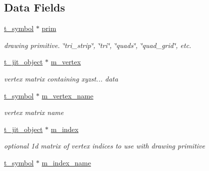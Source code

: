 \subsection*{Data Fields}
\begin{DoxyCompactItemize}
\item 
\hypertarget{structt__jit__glchunk_a22da2556786126c83063dd02d840b942}{
\hyperlink{structt__symbol}{t\_\-symbol} $\ast$ \hyperlink{structt__jit__glchunk_a22da2556786126c83063dd02d840b942}{prim}}
\label{structt__jit__glchunk_a22da2556786126c83063dd02d840b942}

\begin{DoxyCompactList}\small\item\em drawing primitive. \char`\"{}tri\_\-strip\char`\"{}, \char`\"{}tri\char`\"{}, \char`\"{}quads\char`\"{}, \char`\"{}quad\_\-grid\char`\"{}, etc. \item\end{DoxyCompactList}\item 
\hypertarget{structt__jit__glchunk_afda5987affab18e019db62c2c82f0fb1}{
\hyperlink{structt__object}{t\_\-jit\_\-object} $\ast$ \hyperlink{structt__jit__glchunk_afda5987affab18e019db62c2c82f0fb1}{m\_\-vertex}}
\label{structt__jit__glchunk_afda5987affab18e019db62c2c82f0fb1}

\begin{DoxyCompactList}\small\item\em vertex matrix containing xyzst... data \item\end{DoxyCompactList}\item 
\hypertarget{structt__jit__glchunk_a9bce4bdb3c1d139db0ae6fa21163d1eb}{
\hyperlink{structt__symbol}{t\_\-symbol} $\ast$ \hyperlink{structt__jit__glchunk_a9bce4bdb3c1d139db0ae6fa21163d1eb}{m\_\-vertex\_\-name}}
\label{structt__jit__glchunk_a9bce4bdb3c1d139db0ae6fa21163d1eb}

\begin{DoxyCompactList}\small\item\em vertex matrix name \item\end{DoxyCompactList}\item 
\hypertarget{structt__jit__glchunk_a5a0c26b62ca6e44e2b819664a4f16966}{
\hyperlink{structt__object}{t\_\-jit\_\-object} $\ast$ \hyperlink{structt__jit__glchunk_a5a0c26b62ca6e44e2b819664a4f16966}{m\_\-index}}
\label{structt__jit__glchunk_a5a0c26b62ca6e44e2b819664a4f16966}

\begin{DoxyCompactList}\small\item\em optional 1d matrix of vertex indices to use with drawing primitive \item\end{DoxyCompactList}\item 
\hypertarget{structt__jit__glchunk_a1f76754c53f0dd559e290022acb6c4ca}{
\hyperlink{structt__symbol}{t\_\-symbol} $\ast$ \hyperlink{structt__jit__glchunk_a1f76754c53f0dd559e290022acb6c4ca}{m\_\-index\_\-name}}
\label{structt__jit__glchunk_a1f76754c53f0dd559e290022acb6c4ca}


\end{DoxyCompactItemize}
